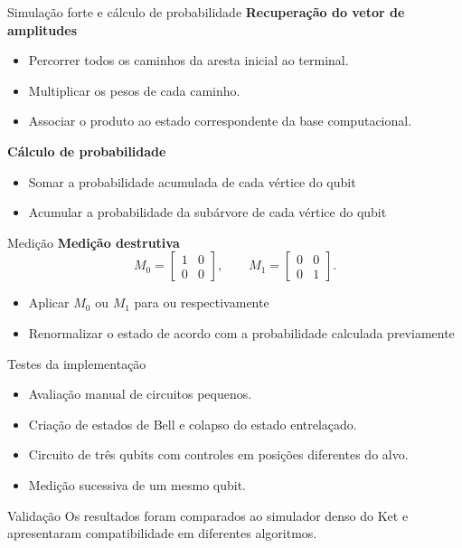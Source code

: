 \documentclass{beamer}
\begin{document}
\begin{frame}{Simulação forte e cálculo de probabilidade}
  \textbf{Recuperação do vetor de amplitudes}
  \begin{itemize}
    \item Percorrer todos os caminhos da aresta inicial ao terminal.
    \item Multiplicar os pesos de cada caminho.
    \item Associar o produto ao estado correspondente da base computacional.
  \end{itemize}

  \textbf{Cálculo de probabilidade}
  \begin{itemize}
    \item Somar a probabilidade acumulada de cada vértice do qubit
    \item Acumular a probabilidade da subárvore de cada vértice do qubit
  \end{itemize}
\end{frame}

\begin{frame}{Medição}
\textbf{Medição destrutiva}
  \[
    M_0=
    \begin{bmatrix}
      1&0\\
      0&0
    \end{bmatrix},
    \qquad
    M_1=
    \begin{bmatrix}
      0&0\\
      0&1
    \end{bmatrix}.
  \]
  
  \begin{itemize}
    \item Aplicar $M_0$ ou $M_1$ para  ou  respectivamente
    \item Renormalizar o estado de acordo com a probabilidade calculada previamente
  \end{itemize}
\end{frame}

\begin{frame}{Testes da implementação}
  \begin{itemize}
    \item Avaliação manual de circuitos pequenos.
    \item Criação de estados de Bell e colapso do estado entrelaçado.
    \item Circuito de três qubits com controles em posições diferentes do alvo.
    \item Medição sucessiva de um mesmo qubit.
  \end{itemize}

  \begin{exampleblock}{Validação}
    Os resultados foram comparados ao simulador denso do Ket e apresentaram compatibilidade em diferentes algoritmos.
  \end{exampleblock}
\end{frame}
\end{document}
